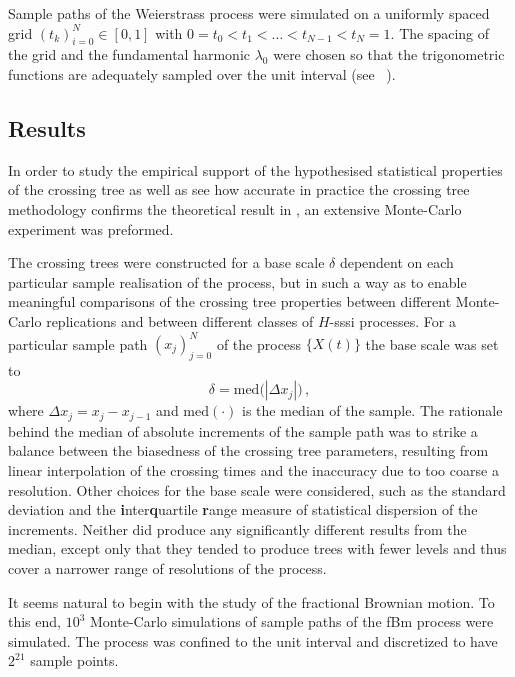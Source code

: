 \documentclass[a4paper]{article}
\begin{document}
Sample paths of the Weierstrass process were simulated on a uniformly spaced grid
$(t_k)_{i=0}^N\in [0,1]$ with $0 = t_0< t_1 < \ldots < t_{N-1} < t_N = 1$. The spacing
of the grid and the fundamental harmonic $\lambda_0$ were chosen so that the trigonometric
functions are adequately sampled over the unit interval (see ~\cite{decrouez2013}).


\subsection{Results} %
\label{sub:results}

In order to study the empirical support of the hypothesised statistical properties of
the crossing tree as well as see how accurate in practice the crossing tree methodology
confirms the theoretical result in \cite{ECP1673}, an extensive Monte-Carlo experiment
was preformed.

The crossing trees were constructed for a base scale $\delta$ dependent on each particular
sample realisation of the process, but in such a way as to enable meaningful comparisons
of the crossing tree properties between different Monte-Carlo replications and between
different classes of $H$-sssi processes. For a particular sample path $(x_j)_{j=0}^N$
of the process $\{X(t)\}$ the base scale was set to
\[ \delta = \text{med}\bigl( |\Delta x_j| \bigr) \,, \]
where $\Delta x_j = x_j - x_{j-1}$ and $\text{med}(\cdot)$ is the median of the
sample. The rationale behind the median of absolute increments of the sample path
was to strike a balance between the biasedness of the crossing tree parameters,
resulting from linear interpolation of the crossing times and the inaccuracy due to
too coarse a resolution. Other choices for the base scale were considered, such
as the standard deviation and the \textbf{i}nter\textbf{q}uartile \textbf{r}ange
measure of statistical dispersion of the increments. Neither did produce any significantly
different results from the median, except only that they tended to produce trees with
fewer levels and thus cover a narrower range of resolutions of the process.

It seems natural to begin with the study of the fractional Brownian motion. To this end,
$10^3$ Monte-Carlo simulations of sample paths of the fBm process were simulated. The
process was confined to the unit interval and discretized to have $2^{21}$ sample points.
\end{document}
